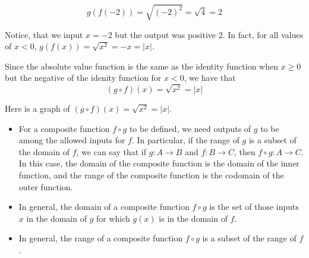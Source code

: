 \documentclass{ximera}
\begin{document}
\begin{example}
\begin{explanation}
\begin{enumerate}[label=\alph*.]
$$g(f(-2))=\sqrt{(-2)^2}=\sqrt{4}=2$$

Notice, that we input $x=-2$ but the output was positive 2.  In fact, for all values of $x<0$, $g(f(x))=\sqrt{x^2}=-x=|x|$.

Since the absolute value function is the same as the identity function when $x \geq 0$ but the negative of the idenity function for $x<0$, we have that 
$$(g \circ f)(x) =  \sqrt{x^2} = |x|$$

Here is a graph of $(g \circ f)(x) =  \sqrt{x^2} = |x|$.

\begin{image}
\end{image}
\end{enumerate}
\end{explanation}

\end{example}


\begin{summary}\begin{itemize}
\item For a composite function $f \circ g$ to be defined, we need outputs of $g$ to be among the allowed inputs for $f$.  In particular, if the range of $g$ is a subset of the domain of $f$, we can say that if $g : A \to B$ and $f : B \to C$, then $f \circ g : A \to C$.  In this case, the domain of the composite function is the domain of the inner function, and the range of the composite function is the codomain of the outer function.
\item In general, the domain of a composite function $f \circ g$ is the set of those inputs $x$ in the domain of $g$ for which $g(x)$ is in the domain of $f$. 
\item In general, the range of a composite function $f \circ g$ is a subset of the range of $f$. 
\end{itemize}\end{summary}
\end{document}
